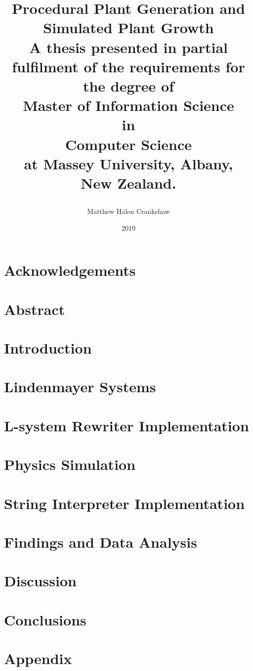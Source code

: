 \documentclass[11pt, twoside]{report}
\title{
{\huge Procedural Plant Generation and Simulated Plant Growth }\\
\vspace{3cm}
{\large A thesis presented in partial fulfilment of the requirements for the degree of \\
\vspace{4cm}
\large Master of Information Science\\
\large in\\
\large Computer Science\\
\vspace{4cm}
\large at Massey University, Albany, \\
\large New Zealand. }
\vspace{3cm}
\author{Matthew Halen Crankshaw}
\date{2019}
}
\begin{document}
\maketitle

\chapter*{Acknowledgements}

\chapter*{Abstract}

\tableofcontents
\listoffigures
\listoftables


\chapter{Introduction}


\chapter{Lindenmayer Systems}  \label{l-system chapter} 


\chapter{L-system Rewriter Implementation}


\chapter{Physics Simulation}


\chapter{String Interpreter Implementation} \label{interpreter implementation}


\chapter{Findings and Data Analysis}


\chapter{Discussion}


\chapter{Conclusions}


\printglossary[type=\acronymtype]
\printglossary

\appendix
\chapter{Appendix}

\end{document}
